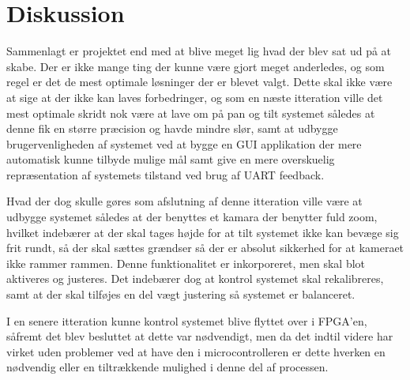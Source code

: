 \section{Diskussion}

Sammenlagt er projektet end med at blive meget lig hvad der blev sat ud på at skabe. Der er ikke mange ting der kunne være gjort meget anderledes, og som regel er det de mest optimale løsninger der er blevet valgt. Dette skal ikke være at sige at der ikke kan laves forbedringer, og som en næste itteration ville det mest optimale skridt nok være at lave om på pan og tilt systemet således at denne fik en større præcision og havde mindre slør, samt at udbygge brugervenligheden af systemet ved at bygge en GUI applikation der mere automatisk kunne tilbyde mulige mål samt give en mere overskuelig repræsentation af systemets tilstand ved brug af UART feedback.

Hvad der dog skulle gøres som afslutning af denne itteration ville være at udbygge systemet således at der benyttes et kamara der benytter fuld zoom, hvilket indebærer at der skal tages højde for at tilt systemet ikke kan bevæge sig frit rundt, så der skal sættes grændser så der er absolut sikkerhed for at kameraet ikke rammer rammen. Denne funktionalitet er inkorporeret, men skal blot aktiveres og justeres. Det indebærer dog at kontrol systemet skal rekalibreres, samt at der skal tilføjes en del vægt justering så systemet er balanceret.

I en senere itteration kunne kontrol systemet blive flyttet over i FPGA'en, såfremt det blev besluttet at dette var nødvendigt, men da det indtil videre har virket uden problemer ved at have den i microcontrolleren er dette hverken en nødvendig eller en tiltrækkende mulighed i denne del af processen.